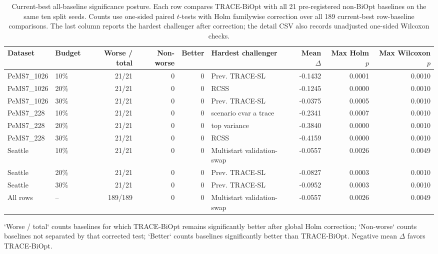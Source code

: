 \begin{table}[pos=htbp]
\centering
\caption{Current-best all-baseline significance posture. Each row compares TRACE-BiOpt with all 21 pre-registered non-BiOpt baselines on the same ten split seeds. Counts use one-sided paired $t$-tests with Holm familywise correction over all 189 current-best row-baseline comparisons. The last column reports the hardest challenger after correction; the detail CSV also records unadjusted one-sided Wilcoxon checks.}
\label{tab:trace-biopt-significance-posture}
\tiny
\setlength{\tabcolsep}{3pt}
\renewcommand{\arraystretch}{0.95}
\begin{tabularx}{\textwidth}{llrrr>{\raggedright\arraybackslash}Xrrr}
\toprule
Dataset & Budget & Worse / total & Non-worse & Better & Hardest challenger & Mean $\Delta$ & Max Holm $p$ & Max Wilcoxon $p$ \\
\midrule
PeMS7\_1026 & 10\% & 21/21 & 0 & 0 & Prev. TRACE-SL & -0.1432 & 0.0001 & 0.0010 \\
PeMS7\_1026 & 20\% & 21/21 & 0 & 0 & RCSS & -0.1245 & 0.0000 & 0.0010 \\
PeMS7\_1026 & 30\% & 21/21 & 0 & 0 & Prev. TRACE-SL & -0.0375 & 0.0005 & 0.0010 \\
PeMS7\_228 & 10\% & 21/21 & 0 & 0 & scenario cvar a trace & -0.2341 & 0.0007 & 0.0010 \\
PeMS7\_228 & 20\% & 21/21 & 0 & 0 & top variance & -0.3840 & 0.0000 & 0.0010 \\
PeMS7\_228 & 30\% & 21/21 & 0 & 0 & RCSS & -0.4159 & 0.0000 & 0.0010 \\
Seattle & 10\% & 21/21 & 0 & 0 & Multistart validation-swap & -0.0557 & 0.0026 & 0.0049 \\
Seattle & 20\% & 21/21 & 0 & 0 & Prev. TRACE-SL & -0.0827 & 0.0003 & 0.0010 \\
Seattle & 30\% & 21/21 & 0 & 0 & Prev. TRACE-SL & -0.0952 & 0.0003 & 0.0010 \\
All rows & -- & 189/189 & 0 & 0 & Multistart validation-swap & -0.0557 & 0.0026 & 0.0049 \\
\bottomrule
\end{tabularx}
\begin{flushleft}\footnotesize `Worse / total` counts baselines for which TRACE-BiOpt remains significantly better after global Holm correction; `Non-worse` counts baselines not separated by that corrected test; `Better` counts baselines significantly better than TRACE-BiOpt. Negative mean $\Delta$ favors TRACE-BiOpt.\end{flushleft}
\renewcommand{\arraystretch}{1.0}
\end{table}
